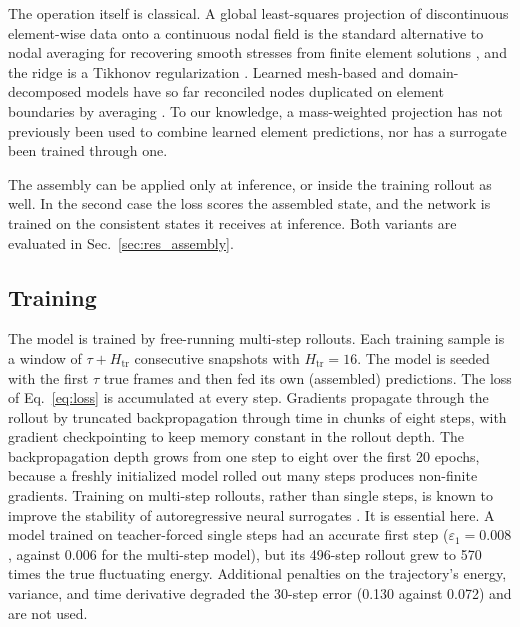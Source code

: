 \documentclass[conf]{new-aiaa}
\begin{document}
The operation itself is classical. A global least-squares projection of discontinuous element-wise data onto a continuous nodal field is the standard alternative to nodal averaging for recovering smooth stresses from finite element solutions \cite{oden1971consistent,hinton1974smoothing,zienkiewicz1992spr}, and the ridge is a Tikhonov regularization \cite{tikhonov1977illposed,hoerl1970ridge}. Learned mesh-based and domain-decomposed models have so far reconciled nodes duplicated on element boundaries by averaging \cite{barwey2024consistent,sankaran2025elementlocal,pan2024ddpdcnn}. To our knowledge, a mass-weighted projection has not previously been used to combine learned element predictions, nor has a surrogate been trained through one.

The assembly can be applied only at inference, or inside the training rollout as well. In the second case the loss scores the assembled state, and the network is trained on the consistent states it receives at inference. Both variants are evaluated in Sec.~\ref{sec:res_assembly}.

\subsection{Training}
The model is trained by free-running multi-step rollouts. Each training sample is a window of $\tau+H_\mathrm{tr}$ consecutive snapshots with $H_\mathrm{tr}=16$. The model is seeded with the first $\tau$ true frames and then fed its own (assembled) predictions. The loss of Eq.~\eqref{eq:loss} is accumulated at every step. Gradients propagate through the rollout by truncated backpropagation through time \cite{werbos1990} in chunks of eight steps, with gradient checkpointing \cite{chen2016checkpoint} to keep memory constant in the rollout depth. The backpropagation depth grows from one step to eight over the first 20 epochs, because a freshly initialized model rolled out many steps produces non-finite gradients. Training on multi-step rollouts, rather than single steps, is known to improve the stability of autoregressive neural surrogates \cite{brandstetter2022mpnn,vlachas2020backprop}. It is essential here. A model trained on teacher-forced single steps had an accurate first step ($\varepsilon_1=0.008$, against 0.006 for the multi-step model), but its 496-step rollout grew to 570 times the true fluctuating energy. Additional penalties on the trajectory's energy, variance, and time derivative degraded the 30-step error (0.130 against 0.072) and are not used.
\end{document}
